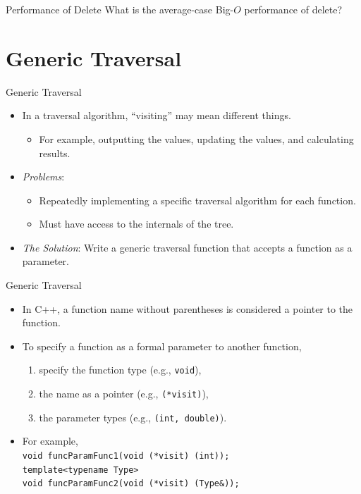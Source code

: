 \documentclass[14pt,aspectratio=1610]{beamer}
\begin{document}
\begin{frame}{Performance of Delete}
  \centering{}\Large
  What is the average-case Big-\(O\) performance of delete?
\end{frame}

\section{Generic Traversal}
\begin{frame}{Generic Traversal}
  \begin{itemize}[<+->]
    \item
      In a traversal algorithm, ``visiting'' may mean different things.
      \begin{itemize}
        \item For example, outputting the values, updating the values, and calculating results.
      \end{itemize}
    \item
      \emph{Problems}:
      \begin{itemize}
        \item
          Repeatedly implementing a specific traversal algorithm for each function.
        \item 
          Must have access to the internals of the tree.
      \end{itemize}
    \item
      \emph{The Solution}: Write a generic traversal function that accepts a function as a parameter.
  \end{itemize}
\end{frame}

\begin{frame}{Generic Traversal}
  \begin{itemize}[<+->]
    \item
      In C++, a function name without parentheses is considered a pointer to the function.
    \item
      To specify a function as a formal parameter to another function,
      \begin{enumerate}
        \item specify the function type (e.g., \lstinline{void}),
        \item the name as a pointer (e.g., \lstinline{(*visit)}),
        \item the parameter types (e.g., \lstinline{(int, double)}).
      \end{enumerate}
    \item For example,\\
      \lstinline{void funcParamFunc1(void (*visit) (int));}\\[1em]
      \lstinline{template<typename Type>}\\
      \lstinline{void funcParamFunc2(void (*visit) (Type&));}
  \end{itemize}
\end{frame}
\end{document}

